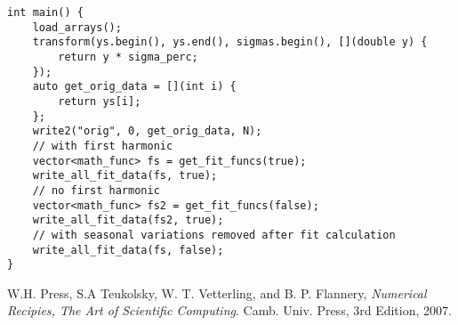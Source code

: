 \documentclass[12pt]{article}
\begin{document}
\begin{lstlisting}
int main() {
    load_arrays();
    transform(ys.begin(), ys.end(), sigmas.begin(), [](double y) {
        return y * sigma_perc;
    });
    auto get_orig_data = [](int i) {
        return ys[i];
    };
    write2("orig", 0, get_orig_data, N);
    // with first harmonic
    vector<math_func> fs = get_fit_funcs(true);
    write_all_fit_data(fs, true);
    // no first harmonic
    vector<math_func> fs2 = get_fit_funcs(false);
    write_all_fit_data(fs2, true);
    // with seasonal variations removed after fit calculation
    write_all_fit_data(fs, false);
}
\end{lstlisting}

\begin{thebibliography}{9}

  W.H. Press, S.A Teukolsky, W. T. Vetterling, and B. P. Flannery,
  \emph{Numerical Recipies, The Art of Scientific Computing}.
  Camb. Univ. Press,
  3rd Edition,
  2007.

\end{thebibliography}
\end{document}
